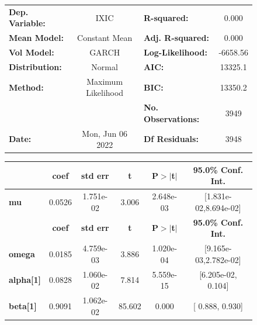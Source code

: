 \documentclass[a4paper, oneside]{discothesis}
\begin{document}
\begin{figure}
\begin{multicols}{2}
{  
\begin{center}
\begin{tabular}{lclc}
\toprule
\textbf{Dep. Variable:} &        IXIC        & \textbf{  R-squared:         } &     0.000   \\
\textbf{Mean Model:}    &   Constant Mean    & \textbf{  Adj. R-squared:    } &     0.000   \\
\textbf{Vol Model:}     &       GARCH        & \textbf{  Log-Likelihood:    } &   -6658.56  \\
\textbf{Distribution:}  &       Normal       & \textbf{  AIC:               } &    13325.1  \\
\textbf{Method:}        & Maximum Likelihood & \textbf{  BIC:               } &    13350.2  \\
\textbf{}               &                    & \textbf{  No. Observations:  } &    3949     \\
\textbf{Date:}          &  Mon, Jun 06 2022  & \textbf{  Df Residuals:      } &    3948     \\
\bottomrule
\end{tabular}
\begin{tabular}{lccccc}
            & \textbf{coef} & \textbf{std err} & \textbf{t} & \textbf{P$> |$t$|$} & \textbf{95.0\% Conf. Int.}  \\
\midrule
\textbf{mu} &       0.0526  &    1.751e-02     &     3.006  &      2.648e-03       &   [1.831e-02,8.694e-02]     \\
                  & \textbf{coef} & \textbf{std err} & \textbf{t} & \textbf{P$> |$t$|$} & \textbf{95.0\% Conf. Int.}  \\
\midrule
\textbf{omega}    &       0.0185  &    4.759e-03     &     3.886  &      1.020e-04       &   [9.165e-03,2.782e-02]     \\
\textbf{alpha[1]} &       0.0828  &    1.060e-02     &     7.814  &      5.559e-15       &    [6.205e-02,  0.104]      \\
\textbf{beta[1]}  &       0.9091  &    1.062e-02     &    85.602  &        0.000         &     [  0.888,  0.930]       \\
\bottomrule
\end{tabular}
\end{center}

}
\end{multicols}
\end{figure}
\end{document}
